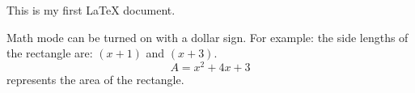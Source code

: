 \documentclass[11]{article}
\begin{document}
This is my first LaTeX document.

Math mode can be turned on with a dollar sign. For example: the side lengths of the rectangle are: $(x + 1)$ and $(x + 3)$. 
$$A = x^2 + 4x + 3$$ represents the area of the rectangle.
\end{document}
